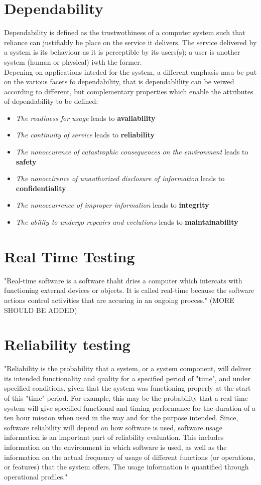 \section{Dependability \cite{lyu}}
Dependability is defined as the trustwothiness of a computer system such that reliance can justifiably be place on the service it delivers. The service delivered by a system is its behaviour as it is perceptible by its users(s); a user is another system (human or physical) iwth the former.\\
Depening on applications inteded for the system, a different emphasis mau be put on the various facets fo dependability, that is dependablility can be veiwed according to different, but complementary properties which enable the attributes of dependability to be defined:
\begin{itemize}
	\item \textit{The readiness for usage} leads to \textbf{availability}
	\item \textit{The continuity of service} leads to \textbf{reliability}
	\item \textit{The nonoccurence of catastrophic consequences on the environment} leads to \textbf{safety}
	\item \textit{The nonoccirence of unauthorized disclosure of information} leads to \textbf{confidentiality}
	\item \textit{The nonoccurrence of improper information} leads to \textbf{integrity}
	\item \textit{The ability to undergo repeairs and evelutions} leads to \textbf{maintainability}
\end{itemize}

\section{Real Time Testing}
"Real-time software is a software thaht dries a computer which intercats  with functioning external devices or objects. It is called real-time because the software actions control activities that are accuring in an ongoing process."\cite{RealTimeTesting}
(MORE SHOULD BE ADDED)

\section{Reliability testing}
"Reliability is the probability that a system, or a system component, will deliver its
intended functionality and quality for a specified period of "time", and under specified
conditions, given that the system was functioning properly at the start of this "time" period. For
example, this may be the probability that a real-time system will give specified functional and
timing performance for the duration of a ten hour mission when used in the way and for the
purpose intended. Since, software reliability will depend on how software is used, software usage
information is an important part of reliability evaluation. This includes information on the
environment in which software is used, as well as the information on the actual frequency of
usage of different functions (or operations, or features) that the system offers. The usage
information is quantified through operational profiles."\cite{vouk}

